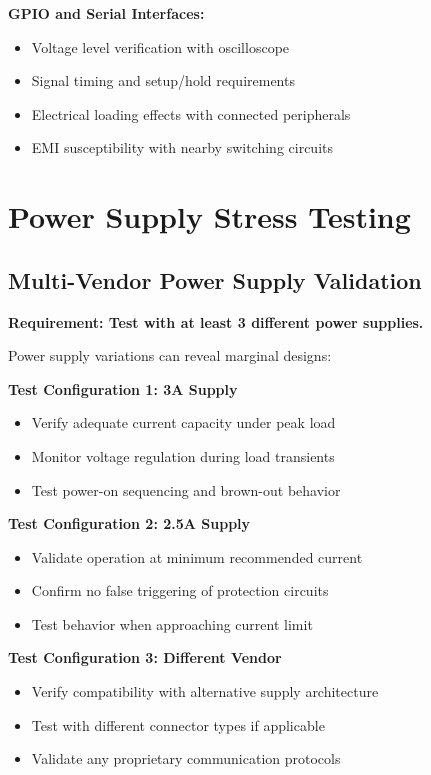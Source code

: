 \textbf{GPIO and Serial Interfaces:}
\begin{itemize}
\item Voltage level verification with oscilloscope
\item Signal timing and setup/hold requirements
\item Electrical loading effects with connected peripherals
\item EMI susceptibility with nearby switching circuits
\end{itemize}

\section{Power Supply Stress Testing}

\subsection{Multi-Vendor Power Supply Validation}

\textbf{Requirement: Test with at least 3 different power supplies.}

Power supply variations can reveal marginal designs:

\textbf{Test Configuration 1: 3A Supply}
\begin{itemize}
\item Verify adequate current capacity under peak load
\item Monitor voltage regulation during load transients
\item Test power-on sequencing and brown-out behavior
\end{itemize}

\textbf{Test Configuration 2: 2.5A Supply}
\begin{itemize}
\item Validate operation at minimum recommended current
\item Confirm no false triggering of protection circuits
\item Test behavior when approaching current limit
\end{itemize}

\textbf{Test Configuration 3: Different Vendor}
\begin{itemize}
\item Verify compatibility with alternative supply architecture
\item Test with different connector types if applicable
\item Validate any proprietary communication protocols
\end{itemize}

